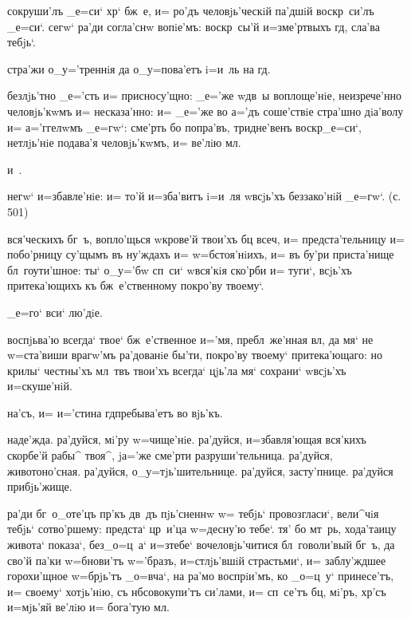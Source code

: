 сокруши'лъ _е=си` хр` бж~е, и= ро'дъ человjь'ческiй 
па'дшiй воскр~си'лъ _е=си`. сегw` ра'ди согла'снw 
вопiе'мъ: воскр~сы'й и=з\ъ ме'ртвыхъ гд, сла'ва 
тебjь`.

стра'жи о_у='треннiя да о_у=пова'етъ i=и~ль на гд.

безлjь'тно _е='сть и= присносу'щно: _е='же w\т дв~ы 
воплоще'нiе, неизрече'нно человjь'кwмъ и= несказа'нно: и= 
_е='же во а='дъ соше'ствiе стра'шно дiа'волу и= 
а='ггелwмъ _е=гw`: сме'рть бо попра'въ, тридне'венъ 
воскр _е=си`, нетлjь'нiе подава'я человjь'кwмъ, и= 
ве'лiю мл.

и~.%


негw` и=збавле'нiе: и= то'й и=зба'витъ i=и~ля w\т всjь'хъ 
беззако'нiй _е=гw`. (с. 501)

вся'ческихъ бг~ъ, вопло'щься w\т крове'й твои'хъ бц 
всеч, и= предста'тельницу и= побо'рницу су'щымъ въ 
ну'ждахъ и= w=бстоя'нiихъ, и= въ бу'ри приста'нище 
бл~гоути'шное: ты` о_у='бw сп~си` w\т вся'кiя ско'рби и= 
туги`, всjь'хъ притека'ющихъ къ бж~е'ственному покро'ву 
твоему`.

_е=го` вси` лю'дiе.

воспjьва'ю всегда` твое` бж~е'ственное и='мя, 
пребл~же'нная вл, да мя` не w=ста'виши врагw'мъ 
ра'дованiе бы'ти, покро'ву твоему` притека'ющаго: но 
крилы` честны'хъ мл~твъ твои'хъ всегда` цjь'ла мя` 
сохрани` w\т всjь'хъ и=скуше'нiй.

на'съ, и= и='стина гд пребыва'етъ во вjь'къ.

наде'жда. ра'дуйся, мi'ру w=чище'нiе. ра'дуйся, 
и=збавля'ющая вся'кихъ скорбе'й рабы^ твоя^, jа='же 
сме'рти разруши'тельница. ра'дуйся, животоно'сная. 
ра'дуйся, о_у=тjь'шительнице. ра'дуйся, засту'пнице. 
ра'дуйся прибjь'жище.

ра'ди бг~о_оте'цъ пр'къ дв~дъ пjь'сненнw w= тебjь` 
провозгласи`, вели^чiя тебjь` сотво'ршему: предста` 
цр~и'ца w=десну'ю тебе`. тя' бо мт~рь, хода'таицу живота` 
показа`, без\ъ _о=ц~а` и=з\ъ тебе` вочеловjь'читися 
бл~говоли'вый бг~ъ, да сво'й па'ки w=бнови'тъ w='бразъ, 
и=стлjь'вшiй страстьми`, и= заблу'ждшее горохи'щное 
w=брjь'тъ _о=вча`, на ра'мо воспрiи'мъ, ко _о=ц~у` 
принесе'тъ, и= своему` хотjь'нiю, съ нб совокупи'тъ 
си'лами, и= сп~се'тъ бц, мi'ръ, хр'съ и=мjь'яй 
ве'лiю и= бога'тую мл.

